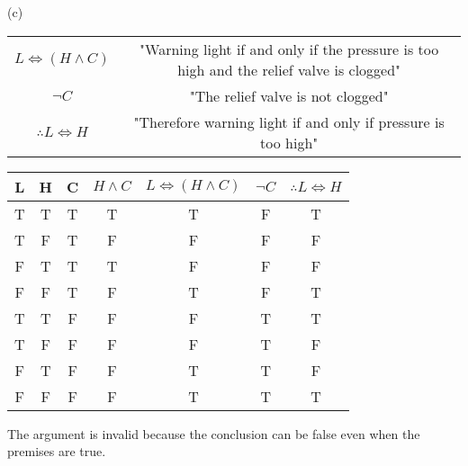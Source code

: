 \documentclass{article}
\begin{document}
  \newline
  (c)\begin{tabular}{cc}
  $L \Leftrightarrow (H \wedge C)$&"Warning light if and only if the pressure is too high and the relief valve is clogged"\\
  $\neg C$&"The relief valve is not clogged"\\
  \hline
  $\therefore L \Leftrightarrow H$&"Therefore warning light if and only if pressure is too high"\\
  \end{tabular}
 \vspace{2em}
 \linebreak
 \begin{tabular}{c|c|c|c|c|c|c}
 L&H&C&$H \wedge C$&$L \Leftrightarrow (H \wedge C)$&$\neg C$&$\therefore L \Leftrightarrow H$\\
 \hline
 T&T&T&T&T&F&T\\
 T&F&T&F&F&F&F\\
 F&T&T&T&F&F&F\\
 F&F&T&F&T&F&T\\
 T&T&F&F&F&T&T\\
 T&F&F&F&F&T&F\\
 F&T&F&F&T&T&F\\
 F&F&F&F&T&T&T\\
 \end{tabular}
 \vspace{2em}
 \linebreak
 The argument is invalid because the conclusion can be false even when the premises are true.\\
\end{document}
